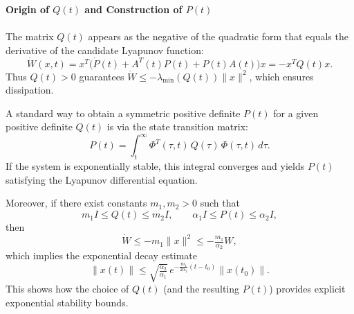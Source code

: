 \begin{remark}\textbf{Origin of $Q(t)$ and Construction of $P(t)$}
\\\\The matrix $Q(t)$ appears as the negative of the quadratic form that equals the derivative of the candidate Lyapunov function:
\begin{equation}
\dot W(x,t) = x^T\big(\dot P(t)+A^T(t)P(t)+P(t)A(t)\big)x = -x^T Q(t)x.
\end{equation}
Thus $Q(t)>0$ guarantees $\dot W \le -\lambda_{\min}(Q(t))\|x\|^2$, which ensures dissipation.

A standard way to obtain a symmetric positive definite $P(t)$ for a given positive definite $Q(t)$ is via the state transition matrix:
\begin{equation}
P(t) = \int_{t}^{\infty} \Phi^T(\tau,t)\,Q(\tau)\,\Phi(\tau,t)\,d\tau.
\end{equation}
If the system is exponentially stable, this integral converges and yields $P(t)$ satisfying the Lyapunov differential equation.

Moreover, if there exist constants $m_1,m_2>0$ such that
\begin{equation}
m_1 I \le Q(t) \le m_2 I, 
\qquad \alpha_1 I \le P(t) \le \alpha_2 I,
\end{equation}
then
\begin{equation}
\dot W \le -m_1 \|x\|^2 \le -\tfrac{m_1}{\alpha_2}W,
\end{equation}
which implies the exponential decay estimate
\begin{equation}
\|x(t)\| \le \sqrt{\tfrac{\alpha_2}{\alpha_1}} \, e^{-\tfrac{m_1}{2\alpha_2}(t-t_0)} \|x(t_0)\|.
\end{equation}
This shows how the choice of $Q(t)$ (and the resulting $P(t)$) provides explicit exponential stability bounds.
\end{remark}

